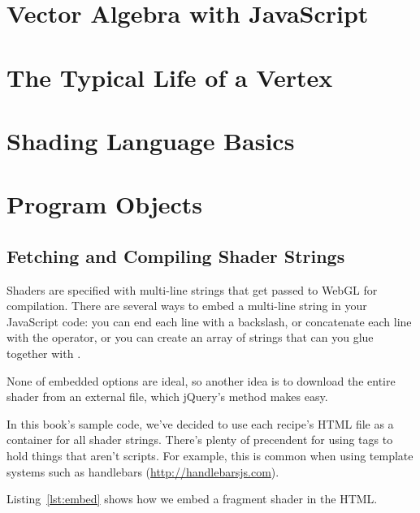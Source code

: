 \section{Vector Algebra with JavaScript}

\section{The Typical Life of a Vertex}

\section{Shading Language Basics}

\section{Program Objects}

\subsection{Fetching and Compiling Shader Strings}

Shaders are specified with multi-line strings that get passed to WebGL for compilation.  There are several ways to embed a multi-line string in your JavaScript code: you can end each line with a backslash, or concatenate each line with the \code{+} operator, or you can create an array of strings that can you glue together with .

None of embedded options are ideal, so another idea is to download the entire shader from an external file, which jQuery's  method makes easy.

In this book's sample code, we've decided to use each recipe's HTML file as a container for all shader strings.  There's plenty of precendent for using  tags to hold things that aren't scripts.  For example, this is common when using template systems such as handlebars (\url{http://handlebarsjs.com}). 

Listing~\ref{lst:embed} shows how we embed a fragment shader in the HTML.

